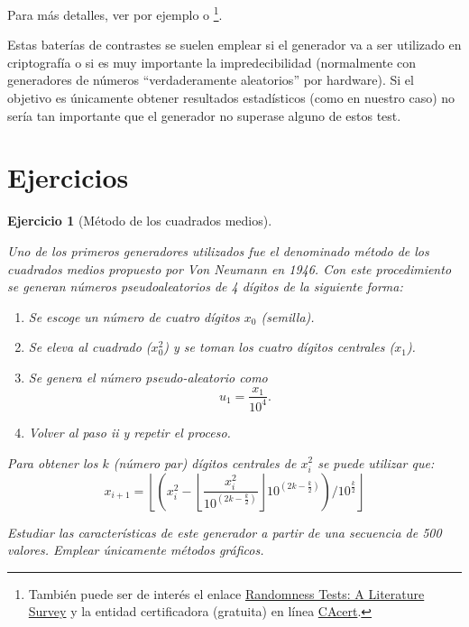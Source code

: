 \documentclass[
  10pt,
]{book}
\theoremstyle{break}
\newtheorem{exercise}{Ejercicio}[chapter]
\theoremstyle{nonumberplain}
\let\oldfootnote\footnote
\renewcommand\footnote[1]{\oldfootnote{\hspace{2mm}#1}}
\begin{document}
Para más detalles, ver por ejemplo \citet{marsaglia2002} o \citet{demirhan2016}\footnote{También puede ser de interés el enlace \href{http://www.ciphersbyritter.com/RES/RANDTEST.HTM}{Randomness Tests: A Literature Survey} y la entidad certificadora (gratuita) en línea \href{http://www.cacert.at/random}{CAcert}.}.

Estas baterías de contrastes se suelen emplear si el generador va a ser utilizado en criptografía o si es muy importante la impredecibilidad (normalmente con generadores de números ``verdaderamente aleatorios'' por hardware).
Si el objetivo es únicamente obtener resultados estadísticos (como en nuestro caso) no sería tan importante que el generador no superase alguno de estos test.

\hypertarget{ejercicios-1}{%
\section{Ejercicios}\label{ejercicios-1}}

\begin{exercise}[Método de los cuadrados medios]
\protect\hypertarget{exr:RANDVN}{}\label{exr:RANDVN}

Uno de los primeros generadores utilizados fue el denominado método de los cuadrados medios propuesto por Von Neumann en 1946.
Con este procedimiento se generan números pseudoaleatorios de 4 dígitos de la siguiente forma:

\begin{enumerate}
\def\labelenumi{\roman{enumi}.}
\item
  Se escoge un número de cuatro dígitos \(x_0\) (semilla).
\item
  Se eleva al cuadrado (\(x_0^2\)) y se toman los cuatro dígitos centrales (\(x_1\)).
\item
  Se genera el número pseudo-aleatorio como \[u_1=\frac{x_1}{10^{4}}.\]
\item
  Volver al paso ii y repetir el proceso.
\end{enumerate}

Para obtener los \(k\) (número par) dígitos centrales de \(x_{i}^2\)
se puede utilizar que:
\[x_{i+1}=\left\lfloor \left(  x_{i}^2-\left\lfloor \dfrac{x_{i}^2}{10^{(2k-\frac{k}2)}}\right\rfloor 10^{(2k-\frac{k}2)}\right)
/10^{\frac{k}2}\right\rfloor\]

Estudiar las características de este generador a partir de una secuencia de 500 valores.
Emplear únicamente métodos gráficos.
\end{exercise}
\end{document}
